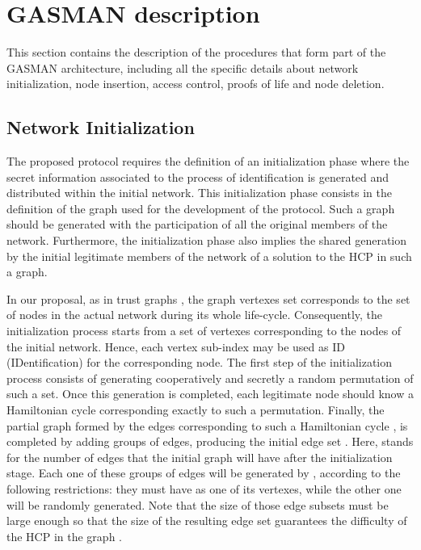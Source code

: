 \documentclass[conference]{IEEEtran}
\begin{document}
\section{GASMAN description}
\label{ElementsDescription}
This section contains the description of the procedures that form part of the GASMAN architecture, including all the specific details
about network initialization, node insertion, access control,
proofs of life and node deletion.
\subsection{Network Initialization}

The proposed protocol requires the
definition of an initialization phase where the secret information
associated to the process of identification is generated and
distributed within the initial network. This initialization phase
consists in the definition of the graph used for the development
of the protocol. Such a graph should be generated with the participation of all the original members of the
network. Furthermore, the initialization phase also implies the shared generation by the initial legitimate members of the network of a solution to the HCP in such a graph.

In our proposal, as in trust graphs \cite{JB}, the graph vertexes set corresponds to the set of nodes in the actual network during its whole life-cycle. Consequently, the initialization process starts from a set  of 
vertexes corresponding to the nodes of the initial network.
Hence, each vertex sub-index may be used as ID
(IDentification) for the corresponding node. The first step of the
initialization process consists of generating cooperatively and secretly
a random permutation  of such a set. Once this generation is
completed, each legitimate node should know a Hamiltonian cycle
 corresponding exactly to such a permutation. Finally, the
partial graph formed by the edges corresponding to such a
Hamiltonian cycle , is completed by adding  groups of
 edges, producing the initial edge set . Here,  stands for the number of edges that the initial graph will have after the initialization stage. Each one of these  groups of edges will be generated by ,  according to the following restrictions: they must have  as one of its vertexes,
while the other one will be randomly generated. Note
that the size  of those edge subsets must
be large enough so that the size of the resulting edge set
 guarantees the difficulty of the HCP in
the graph .
\end{document}
